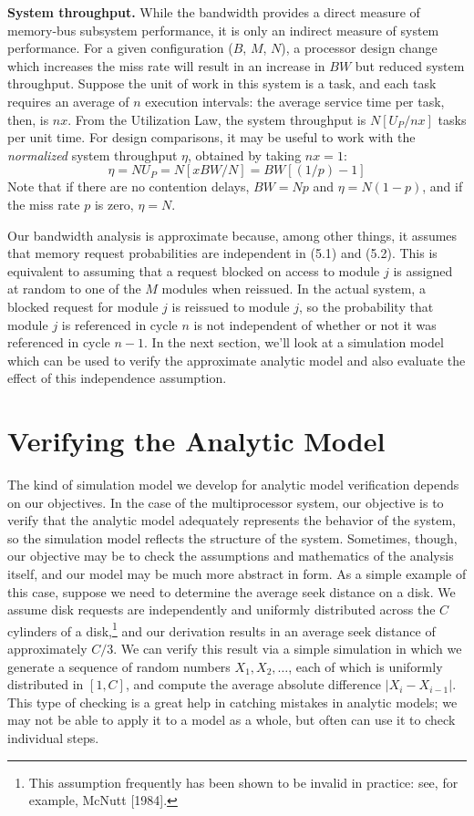 \noindent\textbf{System throughput.} While the bandwidth provides a direct measure of
memory-bus subsystem performance, it is only an indirect measure of system
performance. For a given configuration ($B$, $M$, $N$), a processor design change
which increases the miss rate will result in an increase in $BW$ but reduced
system throughput. Suppose the unit of work in this system is a task, and
each task requires an average of $n$ execution intervals: the average service
time per task, then, is $nx$. From the Utilization Law, the system throughput
is $N[U_P/nx]$ tasks per unit time. For design comparisons, it may be useful to
work with the \emph{normalized} system throughput $\eta$, obtained by taking $nx=1$:
\begin{equation}
\eta=NU_P=N[xBW/N]=BW[(1/p)-1]
\end{equation}
Note that if there are no contention delays, $BW=Np$ and $\eta=N(1-p)$, and
if the miss rate $p$ is zero, $\eta=N$.

Our bandwidth analysis is approximate because, among other things, it
assumes that memory request probabilities are independent in (5.1) and (5.2).
This is equivalent to assuming that a request blocked on access to module $j$ is
assigned at random to one of the $M$ modules when reissued. In the actual
system, a blocked request for module $j$ is reissued to module $j$, so the probability
that module $j$ is referenced in cycle $n$ is not independent of whether or
not it was referenced in cycle $n-1$. In the next section, we'll look at a
simulation model which can be used to verify the approximate analytic
model and also evaluate the effect of this independence assumption.

\section{Verifying the Analytic Model}
\label{sec:mp-verify}

The kind of simulation model we develop for analytic model verification
depends on our objectives. In the case of the multiprocessor system, our
objective is to verify that the analytic model adequately represents the
behavior of the system, so the simulation model reflects the structure of the
system. Sometimes, though, our objective may be to check the assumptions
and mathematics of the analysis itself, and our model may be much more
abstract in form. As a simple example of this case, suppose we need to determine
the average seek distance on a disk. We assume disk requests are
independently and uniformly distributed across the $C$ cylinders of a disk,\footnote{This assumption frequently has been shown to be invalid in practice: see, for example, McNutt [1984].}
and our derivation results in an average seek distance of approximately $C/3$.
We can verify this result via a simple simulation in which we generate a
sequence of random numbers $X_1, X_2, \ldots$, each of which is uniformly distributed
in $[1,C]$, and compute the average absolute difference $|X_i-X_{i-1}|$. This type
of checking is a great help in catching mistakes in analytic models; we may
not be able to apply it to a model as a whole, but often can use it to check
individual steps.

